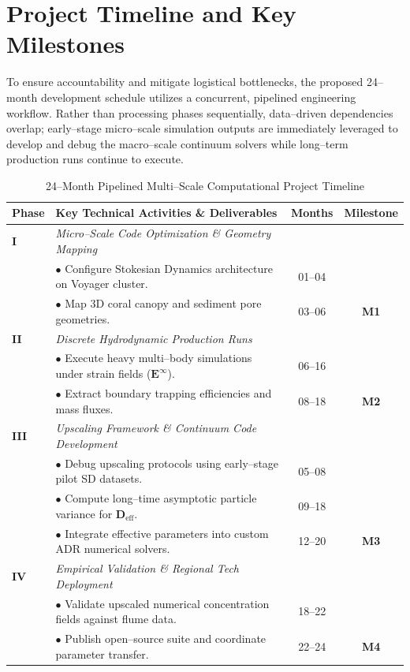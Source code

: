 \section{Project Timeline and Key Milestones}
\label{sec:timeline}

To ensure accountability and mitigate logistical bottlenecks, the proposed 24--month development schedule utilizes a concurrent, pipelined engineering workflow. Rather than processing phases sequentially, data--driven dependencies overlap; early--stage micro--scale simulation outputs are immediately leveraged to develop and debug the macro--scale continuum solvers while long--term production runs continue to execute.

\begin{table}[H]
\centering
\caption{24--Month Pipelined Multi--Scale Computational Project Timeline}
\label{tab:timeline}
\vspace{2mm}
\small
\begin{tabular}{llcc}
\toprule
\textbf{Phase} & \textbf{Key Technical Activities \& Deliverables} & \textbf{Months} & \textbf{Milestone} \\
\midrule
\textbf{I} & \textit{Micro--Scale Code Optimization \& Geometry Mapping} & & \\
& $\bullet$ Configure Stokesian Dynamics architecture on Voyager cluster. & 01--04 & \\
& $\bullet$ Map 3D coral canopy and sediment pore geometries. & 03--06 & \textbf{M1} \\
\addlinespace
\textbf{II} & \textit{Discrete Hydrodynamic Production Runs} & & \\
& $\bullet$ Execute heavy multi--body simulations under strain fields ($\bm{{E}}^{\infty}$). & 06--16 & \\
& $\bullet$ Extract boundary trapping efficiencies and mass fluxes. & 08--18 & \textbf{M2} \\
\addlinespace
\textbf{III} & \textit{Upscaling Framework \& Continuum Code Development} & & \\
& $\bullet$ Debug upscaling protocols using early--stage pilot SD datasets. & 05--08 & \\
& $\bullet$ Compute long--time asymptotic particle variance for $\bm{D}_{\text{eff}}$. & 09--18 & \\
& $\bullet$ Integrate effective parameters into custom ADR numerical solvers. & 12--20 & \textbf{M3} \\
\addlinespace
\textbf{IV} & \textit{Empirical Validation \& Regional Tech Deployment} & & \\
& $\bullet$ Validate upscaled numerical concentration fields against flume data. & 18--22 & \\
& $\bullet$ Publish open--source suite and coordinate parameter transfer. & 22--24 & \textbf{M4} \\
\bottomrule
\end{tabular}
\end{table}

